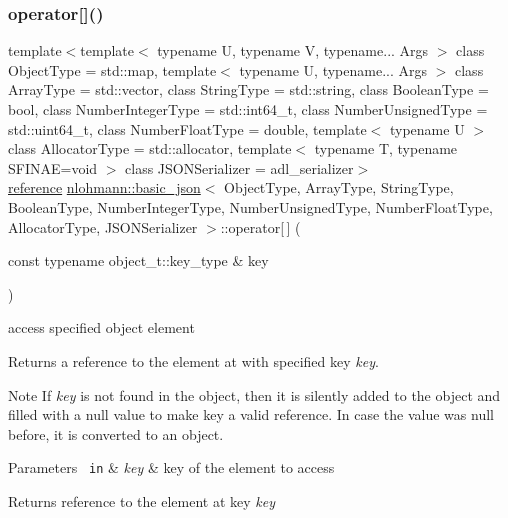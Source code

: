 \subsubsection{\texorpdfstring{operator[]()}{operator[]()}\hspace{0.1cm}{\footnotesize\ttfamily [3/10]}}
{\footnotesize\ttfamily template$<$template$<$ typename U, typename V, typename... Args $>$ class Object\+Type = std\+::map, template$<$ typename U, typename... Args $>$ class Array\+Type = std\+::vector, class String\+Type  = std\+::string, class Boolean\+Type  = bool, class Number\+Integer\+Type  = std\+::int64\+\_\+t, class Number\+Unsigned\+Type  = std\+::uint64\+\_\+t, class Number\+Float\+Type  = double, template$<$ typename U $>$ class Allocator\+Type = std\+::allocator, template$<$ typename T, typename S\+F\+I\+N\+A\+E=void $>$ class J\+S\+O\+N\+Serializer = adl\+\_\+serializer$>$ \\
\mbox{\hyperlink{classnlohmann_1_1basic__json_ac6a5eddd156c776ac75ff54cfe54a5bc}{reference}} \mbox{\hyperlink{classnlohmann_1_1basic__json}{nlohmann\+::basic\+\_\+json}}$<$ Object\+Type, Array\+Type, String\+Type, Boolean\+Type, Number\+Integer\+Type, Number\+Unsigned\+Type, Number\+Float\+Type, Allocator\+Type, J\+S\+O\+N\+Serializer $>$\+::operator\mbox{[}$\,$\mbox{]} (\begin{DoxyParamCaption}\item[{const typename object\+\_\+t\+::key\+\_\+type \&}]{key }\end{DoxyParamCaption})\hspace{0.3cm}{\ttfamily [inline]}}



access specified object element 

Returns a reference to the element at with specified key {\itshape key}.

\begin{DoxyNote}{Note}
If {\itshape key} is not found in the object, then it is silently added to the object and filled with a {\ttfamily null} value to make {\ttfamily key} a valid reference. In case the value was {\ttfamily null} before, it is converted to an object.
\end{DoxyNote}

\begin{DoxyParams}[1]{Parameters}
\mbox{\texttt{ in}}  & {\em key} & key of the element to access\\
\hline
\end{DoxyParams}
\begin{DoxyReturn}{Returns}
reference to the element at key {\itshape key} 
\end{DoxyReturn}

